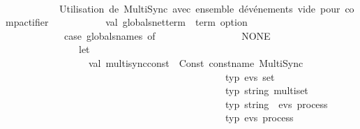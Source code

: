 \begin{isabellebody}
\ \ \ \ \ \ \ \ \ \ \isanewline
\ \ \ \ \ \ \ \ \ \ {\isacharparenleft}{\kern0pt}{\isacharasterisk}{\kern0pt}\ Utilisation\ de\ MultiSync\ avec\ ensemble\ d{\isacharprime}{\kern0pt}événements\ vide\ pour\ compactifier\ {\isacharasterisk}{\kern0pt}{\isacharparenright}{\kern0pt}\isanewline
\ \ \ \ \ \ \ \ \ \ val\ globals{\isacharunderscore}{\kern0pt}net{\isacharunderscore}{\kern0pt}term\ {\isacharcolon}{\kern0pt}\ term\ option\ {\isacharequal}{\kern0pt}\isanewline
\ \ \ \ \ \ \ \ \ \ \ \ {\isacharparenleft}{\kern0pt}case\ globals{\isacharunderscore}{\kern0pt}names\ of\isanewline
\ \ \ \ \ \ \ \ \ \ \ \ \ \ \ {\isacharbrackleft}{\kern0pt}{\isacharbrackright}{\kern0pt}\ {\isacharequal}{\kern0pt}{\isachargreater}{\kern0pt}\ NONE\isanewline
\ \ \ \ \ \ \ \ \ \ \ \ \ {\isacharbar}{\kern0pt}\ {\isacharunderscore}{\kern0pt}\ {\isacharequal}{\kern0pt}{\isachargreater}{\kern0pt}\ \isanewline
\ \ \ \ \ \ \ \ \ \ \ \ \ \ \ let\isanewline
\ \ \ \ \ \ \ \ \ \ \ \ \ \ \ \ \ val\ multisync{\isacharunderscore}{\kern0pt}const\ {\isacharequal}{\kern0pt}\ Const\ {\isacharparenleft}{\kern0pt}{\isacharat}{\kern0pt}{\isacharbraceleft}{\kern0pt}const{\isacharunderscore}{\kern0pt}name\ MultiSync{\isacharbraceright}{\kern0pt}{\isacharcomma}{\kern0pt}\ \isanewline
\ \ \ \ \ \ \ \ \ \ \ \ \ \ \ \ \ \ \ \ \ \ \ \ \ \ \ \ \ \ \ \ \ \ \ \ \ \ \ \ \ \ \ \ \ {\isacharat}{\kern0pt}{\isacharbraceleft}{\kern0pt}typ\ {\isachardoublequote}{\kern0pt}evs\ set{\isachardoublequote}{\kern0pt}{\isacharbraceright}{\kern0pt}\ {\isacharminus}{\kern0pt}{\isacharminus}{\kern0pt}{\isachargreater}{\kern0pt}\ \isanewline
\ \ \ \ \ \ \ \ \ \ \ \ \ \ \ \ \ \ \ \ \ \ \ \ \ \ \ \ \ \ \ \ \ \ \ \ \ \ \ \ \ \ \ \ \ {\isacharat}{\kern0pt}{\isacharbraceleft}{\kern0pt}typ\ {\isachardoublequote}{\kern0pt}string\ multiset{\isachardoublequote}{\kern0pt}{\isacharbraceright}{\kern0pt}\ {\isacharminus}{\kern0pt}{\isacharminus}{\kern0pt}{\isachargreater}{\kern0pt}\ \isanewline
\ \ \ \ \ \ \ \ \ \ \ \ \ \ \ \ \ \ \ \ \ \ \ \ \ \ \ \ \ \ \ \ \ \ \ \ \ \ \ \ \ \ \ \ \ {\isacharat}{\kern0pt}{\isacharbraceleft}{\kern0pt}typ\ {\isachardoublequote}{\kern0pt}string\ {\isasymRightarrow}\ {\isacharparenleft}{\kern0pt}evs{\isacharparenright}{\kern0pt}\ process{\isachardoublequote}{\kern0pt}{\isacharbraceright}{\kern0pt}\ {\isacharminus}{\kern0pt}{\isacharminus}{\kern0pt}{\isachargreater}{\kern0pt}\ \isanewline
\ \ \ \ \ \ \ \ \ \ \ \ \ \ \ \ \ \ \ \ \ \ \ \ \ \ \ \ \ \ \ \ \ \ \ \ \ \ \ \ \ \ \ \ \ {\isacharat}{\kern0pt}{\isacharbraceleft}{\kern0pt}typ\ {\isachardoublequote}{\kern0pt}{\isacharparenleft}{\kern0pt}evs{\isacharparenright}{\kern0pt}\ process{\isachardoublequote}{\kern0pt}{\isacharbraceright}{\kern0pt}{\isacharparenright}{\kern0pt}\isanewline

\end{isabellebody}
